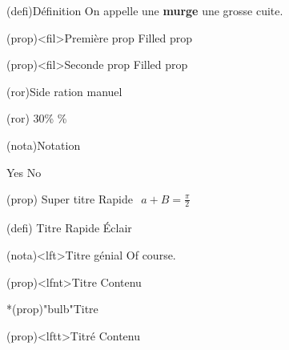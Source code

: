 \documentclass[a4paper, 10pt, garamond]{book}
\begin{document}
\begin{tcb}(defi){Définition}
	On appelle une \textbf{murge} une grosse cuite.
\end{tcb}

\begin{tcb*}(prop)<fil>{Première prop}
	Filled prop
\end{tcb*}

\begin{tcb}(prop)<fil>{Seconde prop}
	Filled prop
\end{tcb}

\begin{tcb}(ror){Side ration manuel}
	\lipsum[1]
	\smallbreak
	\begin{isd}[righthand ratio=.7](ror)
		30\%
		\%
	\end{isd}
\end{tcb}

\begin{tcb*}(nota){Notation}
	\lipsum[1]
	\begin{isd}[cnt]
		Yes
		\tcblower
		No
	\end{isd}
	\lipsum[2]
\end{tcb*}

\sde[right](prop)
{Super titre}{
	Rapide
}{
	$
		\begin{gathered}
			a + B = \frac{\pi}{2}
		\end{gathered}
	$
}


(defi)
{Titre}{
	Rapide
}{
	Éclair
}

\sde[right, ](nota)<lft>{Titre génial}{
	\lipsum[2]
}{
	Of course.
}

\begin{tcb}(prop)<lfnt>{Titre}
	Contenu
\end{tcb}

\begin{tcb}*(prop)"bulb"{Titre}

\end{tcb}

\begin{tcb}(prop)<lftt>{Titré}
	Contenu
\end{tcb}
\end{document}

